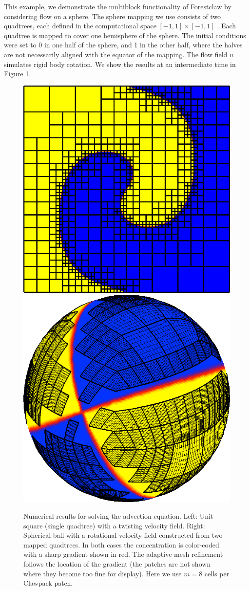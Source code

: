 \documentclass{IOS-Book-Article}     %
\newcommand{\clawpack}{{\sc Clawpack}\xspace}
\newcommand{\forestclaw}{Forestclaw\xspace}
\newcommand{\plotbox}[1]{#1}
\newcommand{\Fig}[1]{Figure \ref{fig:#1}}
\begin{document}

 This example, we demonstrate the
multiblock functionality of \forestclaw by considering flow on a
sphere.  The sphere mapping we use consists of two quadtrees, each
defined in the computational space $[-1,1] \times [-1,1]$
\cite{ca-he-le:2008, be-ca-he-le:2009}.  Each quadtree is mapped to cover one hemisphere
of the sphere.  The initial conditions were set to 0 in one half of
the sphere, and 1 in the other half, where the halves are not
necessarily aligned with the equator of the mapping.  The flow field
${u}$ simulates rigid body rotation.  We show the results at an intermediate time in
\Fig{results2d}.

\begin{figure}
\begin{center}
\plotbox{\includegraphics[width=.4\columnwidth]{quadtree}} \hfil
\plotbox{\includegraphics[width=.4\columnwidth]{sphere_plot167}}
\end{center}
\caption{Numerical results for solving the advection equation.  Left:  Unit
square (single quadtree) with a twisting velocity field.  Right: Spherical ball
with a rotational velocity field constructed from two mapped quadtrees.  In
both cases the concentration is color-coded with a sharp gradient shown in red.
The adaptive mesh refinement follows the location of the gradient (the patches
are not shown where they become too fine for display).  Here we use $m = 8$
cells per \clawpack patch.}
\label{fig:results2d}
\end{figure}
\end{document}
